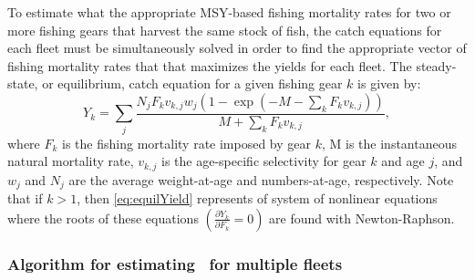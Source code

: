 To estimate what the appropriate MSY-based fishing mortality rates for two or more fishing gears that harvest the same stock of fish, the catch equations for each fleet must be simultaneously solved in order to find the appropriate vector of fishing mortality rates that that maximizes the yields for each fleet.  The steady-state, or equilibrium, catch equation for a given fishing gear $k$ is given by:
\begin{equation}\label{eq:equilYield}
	 Y_{k} = \sum_j\frac{N_j F_k v_{k,j} w_j (1-\exp(-M-\sum_k F_k v_{k,j}))} {M + \sum_k F_k v_{k,j}},
\end{equation}
where $F_k$ is the fishing mortality rate imposed by gear $k$, M is the instantaneous natural mortality rate, $v_{k,j}$ is the age-specific selectivity for gear $k$ and age $j$, and $w_j$ and $N_j$ are the average weight-at-age and numbers-at-age, respectively.  Note that if $k>1$, then \eqref{eq:equilYield} represents of system of nonlinear equations where the roots of these equations $\left(\frac{\partial Y_k}{\partial F_k}=0\right)$ are found with Newton-Raphson.

\subsubsection{Algorithm for estimating \fmsy\ for multiple fleets} %
\label{ssub:algorithm_for_estimating_fmsy_for_multiple_fleets}





